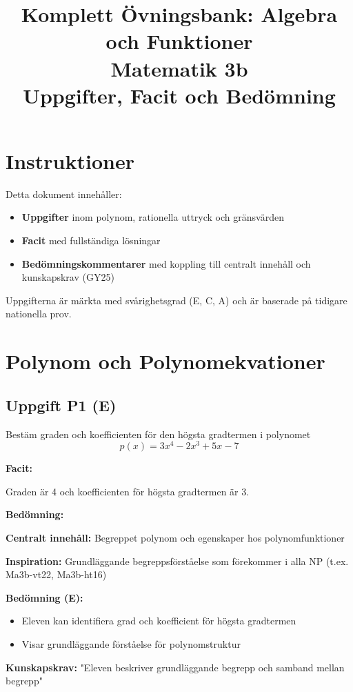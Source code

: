 \documentclass[12pt]{article}
\title{Komplett Övningsbank: Algebra och Funktioner \\ \large Matematik 3b \\ \small Uppgifter, Facit och Bedömning}
\author{}
\date{}
\begin{document}
\maketitle

\tableofcontents
\newpage

\section*{Instruktioner}
Detta dokument innehåller:
\begin{itemize}
    \item \textbf{Uppgifter} inom polynom, rationella uttryck och gränsvärden
    \item \textbf{Facit} med fullständiga lösningar
    \item \textbf{Bedömningskommentarer} med koppling till centralt innehåll och kunskapskrav (GY25)
\end{itemize}

Uppgifterna är märkta med svårighetsgrad (E, C, A) och är baserade på tidigare nationella prov.

\newpage

\section{Polynom och Polynomekvationer}

\subsection*{Uppgift P1 (E)}
Bestäm graden och koefficienten för den högsta gradtermen i polynomet
\[
p(x) = 3x^4 - 2x^3 + 5x - 7
\]

\begin{facitbox}
\textbf{Facit:}

Graden är 4 och koefficienten för högsta gradtermen är 3.
\end{facitbox}

\begin{refbox}
\textbf{Bedömning:}

\textbf{Centralt innehåll:} Begreppet polynom och egenskaper hos polynomfunktioner

\textbf{Inspiration:} Grundläggande begreppsförståelse som förekommer i alla NP (t.ex. Ma3b-vt22, Ma3b-ht16)

\textbf{Bedömning (E):}
\begin{itemize}
    \item Eleven kan identifiera grad och koefficient för högsta gradtermen
    \item Visar grundläggande förståelse för polynomstruktur
\end{itemize}

\textbf{Kunskapskrav:} "Eleven beskriver grundläggande begrepp och samband mellan begrepp"
\end{refbox}
\end{document}
